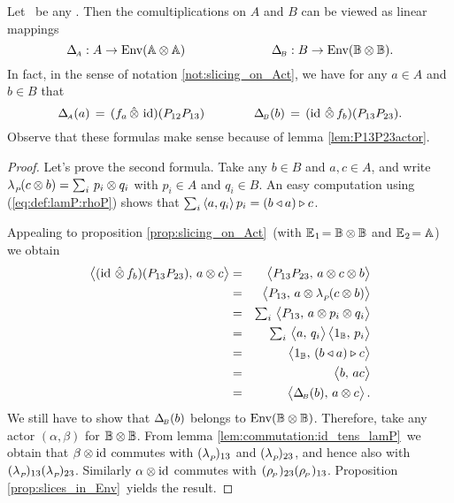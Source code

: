 \begin{prop_sec} \label{prop:comultiplications_in_Env}
Let\/ \pairAB\ be any \idpa\@.
Then the comultiplications on $A$ and\/ $B$ can be viewed as linear mappings
$$ \Delta_{\scriptscriptstyle \! A} : A \rightarrow \mbox{\rm Env}(\mathbb{A} \otimes \mathbb{A})     \hspace{7em}
   \Delta_{\scriptscriptstyle \! B} : B \rightarrow \mbox{\rm Env}(\mathbb{B} \otimes \mathbb{B}). $$
In fact, in the sense of notation \ref{not:slicing_on_Act}, we have
for any\/ $a \in A$ and\/ $b \in B$ that
\begin{equation}\label{eq:comultiplications:slice:Pinverse}
    \Delta_{\scriptscriptstyle \! A}(a) \,=\,  (f_a \,\hat{\otimes}\, \, \mbox{\rm id})(P_{12} P_{13})
                     \hspace{4em}
    \Delta_{\scriptscriptstyle \! B}(b) \,=\,  (\mbox{\rm id}\, \,\hat{\otimes}\, f_b)(P_{13} P_{23}).
\end{equation}
\rm Observe that these formulas make sense because of lemma \ref{lem:P13P23actor}.
\end{prop_sec}

\begin{proof}
Let's prove the second formula. Take any $b\in B$ and $a,c\in A$, and write
$\lambda_{_P\!}(c \otimes b) = \sum_i \,p_i \otimes q_i$ with $p_i \in A$ and $q_i \in B$.
An easy computation using (\ref{eq:def:lamP:rhoP}) shows that
$\sum_i \, \langle a,q_i \rangle\, p_i = (b \triangleleft a) \triangleright c$.

Appealing to proposition \ref{prop:slicing_on_Act}\
(with $\mathbb{E}_{\hspace{0.5pt}1}\!=\mathbb{B} \otimes \mathbb{B}$ and $\mathbb{E}_{\hspace{0.5pt}2}\!=\mathbb{A}$) we obtain
\begin{eqnarray*}
    \pairM{(\id\, \slice f_b)(P_{13} P_{23})}{a \tens c}
&=&
    \pairM{P_{13} P_{23}}{a \tens c \tens b} \\
&=&
    \pairM{P_{13}}{a \tens \lp(c \tens b)} \\
&=&
    \textstyle \sum_i \, \pairM{P_{13}}{a \tens p_i \tens q_i} \\
&=&
    \textstyle \sum_i \, \pairM{a}{q_i} \pairM{1_\BB}{p_i} \\
&=&
    \pairM{1_\BB}{(b \ract a) \lact c} \\
&=&
    \pairM{b}{ac} \\
&=&
    \pairM{\DeltaB(b)}{a \tens c}.
\end{eqnarray*}
We still have to show that $\Delta_{\scriptscriptstyle \! B}(b)$ belongs to $\mbox{\rm Env}(\mathbb{B} \otimes \mathbb{B})$.
Therefore, take any actor $(\alpha,\beta)$ for $\mathbb{B} \otimes \mathbb{B}$.
From lemma \ref{lem:commutation:id_tens_lamP}\ we obtain that
$\beta \otimes \mbox{\rm id}$ commutes with $(\lambda_{_P\!})_{13}$ and $(\lambda_{_P\!})_{23}$,
and hence also with $(\lambda_{_P\!})_{13} (\lambda_{_P\!})_{23}$.
Similarly $\alpha \otimes \mbox{\rm id}$ commutes with $(\rho_{_{\!P}})_{23} (\rho_{_{\!P}})_{13}$.
Proposition \ref{prop:slices_in_Env}\ yields the result.
\end{proof}
\vspace{2ex}


